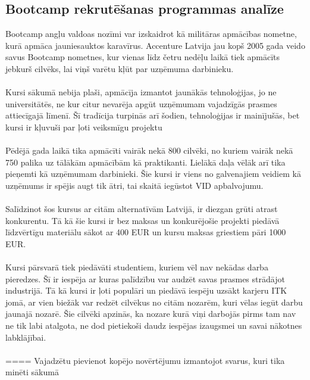 \subsection{Bootcamp rekrutēšanas programmas analīze}
Bootcamp angļu valdoas nozīmi var izskaidrot kā militāras apmācības nometne, kurā apmāca jauniesauktos
karavīrus. Accenture Latvija jau kopš 2005 gada veido savus Bootcamp nometnes, kur vienas līdz četru 
nedēļu laikā tiek apmācīts jebkurš cilvēks, lai viņš varētu kļūt par uzņēmuma darbinieku.
\paragraph{}
Kursi sākumā nebija plaši, apmācīja izmantot jaunākās tehnoloģijas, jo ne universitātēs, ne kur citur
nevarēja apgūt uzņēmumam vajadzīgās prasmes attiecīgajā līmenī. Šī tradīcija turpinās arī šodien,
tehnoloģijas ir mainījušās, bet kursi ir kļuvuši par ļoti veiksmīgu projektu
\paragraph{}
Pēdējā gada laikā tika apmācīti vairāk nekā 800 cilvēki, no kuriem vairāk nekā 750 palika uz tālākām
apmācībām kā praktikanti. Lielākā daļa vēlāk arī tika pieņemti kā uzņēmumam darbinieki. Šie kursi ir
viens no galvenajiem veidiem kā uzņēmums ir spējis augt tik ātri, tai skaitā iegūstot VID apbalvojumu.
\paragraph{}
Salīdzinot šos kursus ar citām alternatīvām Latvijā, ir diezgan grūti atrast konkurentu. Tā kā šie kursi
ir bez maksas un konkurējošie projekti piedāvā līdzvērtīgu materiālu sākot ar 400 EUR un kursu maksas
griestiem pāri 1000 EUR. 
\paragraph{}
Kursi pārsvarā tiek piedāvāti studentiem, kuriem vēl nav nekādas darba pieredzes. Šī ir iespēja
ar kuras palīdzību var audzēt savas prasmes strādājot industrijā. Tā kā kursi ir ļoti populāri un piedāvā
iespēju uzsākt karjeru ITK jomā, ar vien biežāk var redzēt cilvēkus no citām nozarēm, kuri vēlas iegūt
darbu jaunajā nozarē. Šie cilvēki apzinās, ka nozare kurā viņi darbojās pirms tam nav ne tik labi atalgota,
ne dod pietiekoši daudz iespējas izaugsmei un savai nākotnes labklājībai.
\paragraph{}
==== Vajadzētu pievienot kopējo novērtējumu izmantojot svarus, kuri tika minēti sākumā
